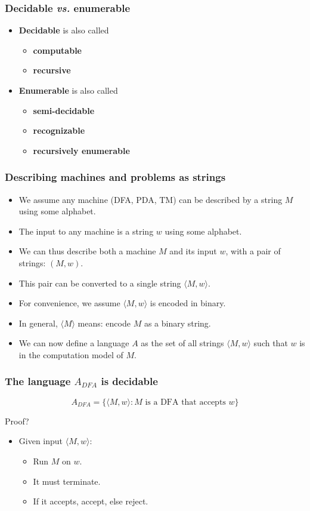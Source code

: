 \documentclass{beamer}
\newcommand{\bfr}[1]{\begin{frame}[fragile]\frametitle{{ #1 }}}
\begin{document}
\bfr{Decidable {\em vs.} enumerable}
\begin{itemize}
\item {\bf Decidable} is also called
  \begin{itemize}
  \item {\bf computable}
  \item {\bf recursive}
  \end{itemize}
  
\item {\bf Enumerable} is also called
  \begin{itemize}
  \item {\bf semi-decidable}
  \item {\bf  recognizable}
  \item {\bf recursively enumerable}
  \end{itemize}
\end{itemize}
\end{frame}

\bfr{Describing machines and problems as strings}
\begin{itemize}
\item We assume any machine (DFA, PDA, TM) can be described by a
  string $M$ using some alphabet.
\item The input to any machine is a string $w$ using some alphabet.
\item We can thus describe both a machine $M$ and its input $w$, with a
  pair of strings: $( M,w )$.
\item This pair can be converted to  a single string
  $\langle M,w  \rangle$.
\item  For convenience, we assume   $\langle M,w  \rangle$ is
  encoded in binary.
  \item In general, $\langle M\rangle$ means: encode $M$ as a binary
    string. 
\item We can now define a language $A$ as the set of all strings
  $\langle M,w \rangle$ such that $w$ is in the computation model of
  $M$. 
\end{itemize}
\end{frame}

\bfr{The language $A_{DFA}$ is decidable}
\[
A_{DFA} = \{ \langle M,w\rangle : \mbox{$M$ is a DFA that accepts $w$}\}
\]

Proof?

\pause

\begin{itemize}
\item Given input $\langle M,w\rangle$:
  \begin{itemize}
  \item Run $M$ on $w$.
  \item It must terminate.
  \item If it accepts, accept, else reject.
  \end{itemize}
\end{itemize}
\end{frame}
\end{document}
